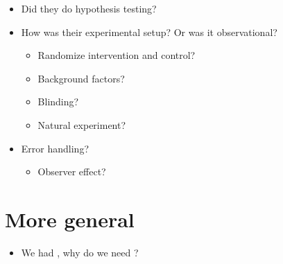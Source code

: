 \begin{frame}
  \begin{question}
    \begin{itemize}
      \item Did they do hypothesis testing?
    \end{itemize}
  \end{question}

  \begin{question}
    \begin{itemize}
      \item How was their experimental setup? Or was it observational?
        \begin{itemize}
          \item Randomize intervention and control?
          \item Background factors?
          \item Blinding?
          \item Natural experiment?
        \end{itemize}
    \end{itemize}
  \end{question}

  \begin{question}
    \begin{itemize}
      \item Error handling?
        \begin{itemize}
          \item Observer effect?
        \end{itemize}
    \end{itemize}
  \end{question}
\end{frame}

\section{More general}

\begin{frame}
  \begin{question}
    \begin{itemize}
      \item We had , why do we need 
        ?
    \end{itemize}
  \end{question}
\end{frame}

